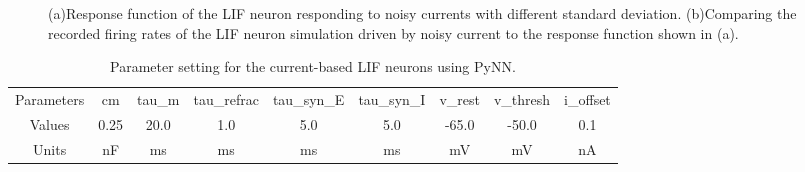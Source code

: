 \documentclass[runningheads,a4paper]{llncs}
\begin{document}
\begin{figure}[bt!]
	\centering
	\caption{
	(a)Response function of the LIF neuron responding to noisy currents with different standard deviation.
	(b)Comparing the recorded firing rates of the LIF neuron simulation driven by noisy current to the response function shown in (a). }
	\label{fig:firefunc}	
\end{figure}
\begin{table}[bt]
	\centering
	\caption{\label{tbl:pynnSetting}Parameter setting for the current-based LIF neurons using PyNN.}
	\bgroup
	\def\arraystretch{1.4}
	\begin{tabular}{c|| c |c| c| c| c| c| c| c}
		\hline
		Parameters & cm & tau\_m & tau\_refrac & tau\_syn\_E & tau\_syn\_I & v\_rest & v\_thresh & i\_offset \\
		Values & 0.25 &  20.0 & 1.0 & 5.0 & 5.0 & -65.0 & -50.0  & 0.1 \\
		Units & nF & ms & ms & ms & ms & mV & mV& nA\\
		\hline
	\end{tabular}
	\egroup
\end{table}
\end{document}
